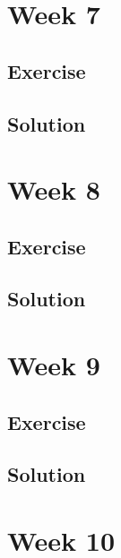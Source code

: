 \documentclass[
]{book}
\begin{document}
\hypertarget{week-7}{%
\chapter{Week 7}\label{week-7}}

\hypertarget{exercise-5}{%
\section{Exercise}\label{exercise-5}}

\hypertarget{solution-6}{%
\section{Solution}\label{solution-6}}

\hypertarget{week-8}{%
\chapter{Week 8}\label{week-8}}

\hypertarget{exercise-6}{%
\section{Exercise}\label{exercise-6}}

\hypertarget{solution-7}{%
\section{Solution}\label{solution-7}}

\hypertarget{week-9}{%
\chapter{Week 9}\label{week-9}}

\hypertarget{exercise-7}{%
\section{Exercise}\label{exercise-7}}

\hypertarget{solution-8}{%
\section{Solution}\label{solution-8}}

\hypertarget{week-10}{%
\chapter{Week 10}\label{week-10}}
\end{document}
